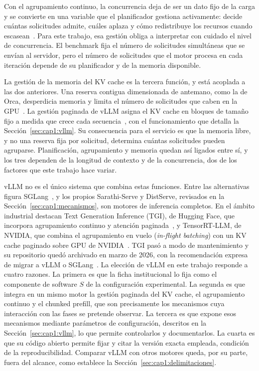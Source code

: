 Con el agrupamiento continuo, la concurrencia deja de ser un dato fijo de la carga y se convierte en una variable que el planificador gestiona activamente: decide cuántas solicitudes admite, cuáles aplaza y cómo redistribuye los recursos cuando escasean~\cite{sun2024llumnix}. Para este trabajo, esa gestión obliga a interpretar con cuidado el nivel de concurrencia. El benchmark fija el número de solicitudes simultáneas que se envían al servidor, pero el número de solicitudes que el motor procesa en cada iteración depende de su planificador y de la memoria disponible.

La gestión de la memoria del KV cache es la tercera función, y está acoplada a las dos anteriores. Una reserva contigua dimensionada de antemano, como la de Orca, desperdicia memoria y limita el número de solicitudes que caben en la GPU~\cite{kwon2023pagedattention}. La gestión paginada de vLLM asigna el KV cache en bloques de tamaño fijo a medida que crece cada secuencia~\cite{kwon2023pagedattention}, con el funcionamiento que detalla la Sección~\ref{sec:cap1:vllm}. Su consecuencia para el servicio es que la memoria libre, y no una reserva fija por solicitud, determina cuántas solicitudes pueden agruparse. Planificación, agrupamiento y memoria quedan así ligados entre sí, y los tres dependen de la longitud de contexto y de la concurrencia, dos de los factores que este trabajo hace variar.

vLLM no es el único sistema que combina estas funciones. Entre las alternativas figura SGLang~\cite{zheng2024sglang}, y los propios Sarathi-Serve y DistServe, revisados en la Sección~\ref{sec:cap1:mecanismos}, son motores de inferencia completos. En el ámbito industrial destacan Text Generation Inference (TGI), de Hugging Face, que incorpora agrupamiento continuo y atención paginada~\cite{hf2023tgi}, y TensorRT-LLM, de NVIDIA, que combina el agrupamiento en vuelo (\textit{in-flight batching}) con un KV cache paginado sobre GPU de NVIDIA~\cite{nvidia2023tensorrtllm}. TGI pasó a modo de mantenimiento y su repositorio quedó archivado en marzo de 2026, con la recomendación expresa de migrar a vLLM o SGLang~\cite{hf2023tgi}.
La elección de vLLM en este trabajo responde a cuatro razones. La primera es que la ficha institucional lo fija como el componente de software $S$ de la configuración experimental. La segunda es que integra en un mismo motor la gestión paginada del KV cache, el agrupamiento continuo y el chunked prefill, que son precisamente los mecanismos cuya interacción con las fases se pretende observar. La tercera es que expone esos mecanismos mediante parámetros de configuración, descritos en la Sección~\ref{sec:cap1:vllm}, lo que permite controlarlos y documentarlos. La cuarta es que su código abierto permite fijar y citar la versión exacta empleada, condición de la reproducibilidad. Comparar vLLM con otros motores queda, por su parte, fuera del alcance, como establece la Sección~\ref{sec:cap1:delimitaciones}.

